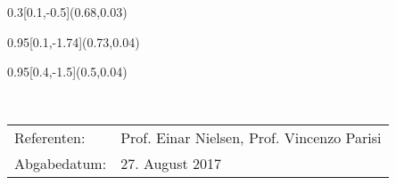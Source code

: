 
\begin{titlepage}
	\setlength{\TPHorizModule}{\paperwidth}
	\setlength{\TPVertModule}{\paperheight}
	
	\begin{textblock}{0.3}[0.1,-0.5](0.68,0.03)
	\end{textblock}
	\begin{textblock}{0.95}[0.1,-1.74](0.73,0.04)
	\end{textblock}
	\begin{textblock}{0.95}[0.4,-1.5](0.5,0.04)
	\end{textblock}

	
    \vspace*{8cm}
    \begin{center}
    	\Huge{\color{HeadBlue}{ROS als unterstützendes Werkzeug für EEROS-Applikationen\\}}
		\vspace*{2cm}
		\normalsize
      	{}\\
		\vspace*{2cm}      	

    \vspace*{3cm}
    \color{HeadBlue}
    \begin{tabular}{p{4cm}l}
      Referenten: & Prof. Einar Nielsen, Prof. Vincenzo Parisi \\
      Abgabedatum: & 27. August 2017
    \end{tabular}\\
    \end{center}
\end{titlepage}
